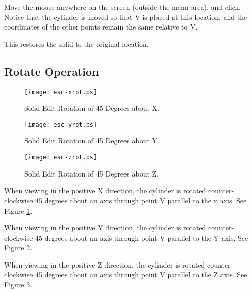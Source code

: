 Move the mouse anywhere on the screen (outside the menu area), and click.
Notice
that the cylinder is moved so that V is placed at this location, and the
coordinates of the other points remain the same relative to V.


This restores the solid to the original location.

\subsection{Rotate Operation}

\begin{figure}
\centering \texttt{[image: esc-xrot.ps]}
\caption{Solid Edit Rotation of 45 Degrees about X.}
\label{esc-xrot}
\end{figure}

\begin{figure}
\centering \texttt{[image: esc-yrot.ps]}
\caption{Solid Edit Rotation of 45 Degrees about Y.}
\label{esc-yrot}
\end{figure}

\begin{figure}
\centering \texttt{[image: esc-zrot.ps]}
\caption{Solid Edit Rotation of 45 Degrees about Z.}
\label{esc-zrot}
\end{figure}


When viewing in the positive X direction, the cylinder is rotated counter-
clockwise 45 degrees about an axis through point V parallel to the x axis.
See Figure \ref{esc-xrot}.


When viewing in the positive Y direction, the cylinder is rotated counter-
clockwise 45 degrees about an axis through point V parallel to the Y axis.
See Figure \ref{esc-yrot}.


When viewing in the positive Z direction, the cylinder is rotated counter-
clockwise 45 degrees about an axis through point V parallel to the Z axis.
See Figure \ref{esc-zrot}.

